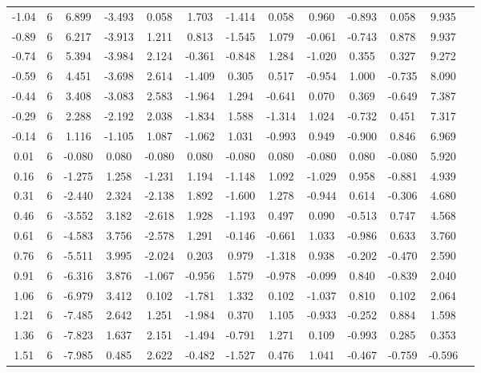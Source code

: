 {\begin{table}[H]
{\begin{tabular}{|c|cccccccccc|c|c|}
        -1.04 & 6 & 6.899 & -3.493 & 0.058 & 1.703 & -1.414 & 0.058 & 0.960 & -0.893 & 0.058 & 9.935 \\ 
        -0.89 & 6 & 6.217 & -3.913 & 1.211 & 0.813 & -1.545 & 1.079 & -0.061 & -0.743 & 0.878 & 9.937 \\ 
        -0.74 & 6 & 5.394 & -3.984 & 2.124 & -0.361 & -0.848 & 1.284 & -1.020 & 0.355 & 0.327 & 9.272 \\ 
        -0.59 & 6 & 4.451 & -3.698 & 2.614 & -1.409 & 0.305 & 0.517 & -0.954 & 1.000 & -0.735 & 8.090 \\
        -0.44 & 6 & 3.408 & -3.083 & 2.583 & -1.964 & 1.294 & -0.641 & 0.070 & 0.369 & -0.649 & 7.387 \\ 
        -0.29 & 6 & 2.288 & -2.192 & 2.038 & -1.834 & 1.588 & -1.314 & 1.024 & -0.732 & 0.451 & 7.317 \\ 
        -0.14 & 6 & 1.116 & -1.105 & 1.087 & -1.062 & 1.031 & -0.993 & 0.949 & -0.900 & 0.846 & 6.969 \\ 
        0.01 & 6 & -0.080 & 0.080 & -0.080 & 0.080 & -0.080 & 0.080 & -0.080 & 0.080 & -0.080 & 5.920 \\ 
        0.16 & 6 & -1.275 & 1.258 & -1.231 & 1.194 & -1.148 & 1.092 & -1.029 & 0.958 & -0.881 & 4.939 \\ 
        0.31 & 6 & -2.440 & 2.324 & -2.138 & 1.892 & -1.600 & 1.278 & -0.944 & 0.614 & -0.306 & 4.680 \\
        0.46 & 6 & -3.552 & 3.182 & -2.618 & 1.928 & -1.193 & 0.497 & 0.090 & -0.513 & 0.747 & 4.568 \\
        0.61 & 6 & -4.583 & 3.756 & -2.578 & 1.291 & -0.146 & -0.661 & 1.033 & -0.986 & 0.633 & 3.760 \\
        0.76 & 6 & -5.511 & 3.995 & -2.024 & 0.203 & 0.979 & -1.318 & 0.938 & -0.202 & -0.470 & 2.590 \\ 
        0.91 & 6 & -6.316 & 3.876 & -1.067 & -0.956 & 1.579 & -0.978 & -0.099 & 0.840 & -0.839 & 2.040 \\ 
        1.06 & 6 & -6.979 & 3.412 & 0.102 & -1.781 & 1.332 & 0.102 & -1.037 & 0.810 & 0.102 & 2.064 \\
        1.21 & 6 & -7.485 & 2.642 & 1.251 & -1.984 & 0.370 & 1.105 & -0.933 & -0.252 & 0.884 & 1.598 \\ 
        1.36 & 6 & -7.823 & 1.637 & 2.151 & -1.494 & -0.791 & 1.271 & 0.109 & -0.993 & 0.285 & 0.353 \\ 
        1.51 & 6 & -7.985 & 0.485 & 2.622 & -0.482 & -1.527 & 0.476 & 1.041 & -0.467 & -0.759 & -0.596 \\ 

\end{tabular}}
\end{table}}
